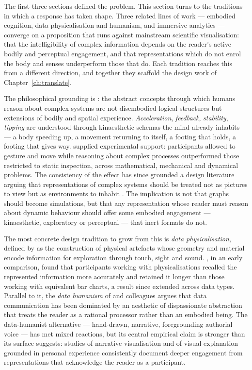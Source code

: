 The first three sections defined the problem. This section turns to the traditions in which a response has taken shape. Three related lines of work --- embodied cognition, data physicalisation and humanism, and immersive analytics --- converge on a proposition that runs against mainstream scientific visualisation: that the intelligibility of complex information depends on the reader's active bodily and perceptual engagement, and that representations which do not enrol the body and senses underperform those that do. Each tradition reaches this from a different direction, and together they scaffold the design work of Chapter~\ref{ch:translate}.

The philosophical grounding is \citet{lakoff1999}: the abstract concepts through which humans reason about complex systems are not disembodied logical structures but extensions of bodily and spatial experience. \emph{Acceleration}, \emph{feedback}, \emph{stability}, \emph{tipping} are understood through kinaesthetic schemas the mind already inhabits --- a body speeding up, a movement returning to itself, a footing that holds, a footing that gives way. \citet{kirsh2013} supplied experimental support: participants allowed to gesture and move while reasoning about complex processes outperformed those restricted to static inspection, across mathematical, mechanical and dynamical problems. The consistency of the effect has since grounded a design literature arguing that representations of complex systems should be treated not as pictures to view but as environments to inhabit \citep{tversky2019, hurtienne2011}. The implication is not that graphs should become simulations, but that any representation whose reader must reason about dynamic behaviour should offer some embodied engagement --- kinaesthetic, exploratory or perceptual --- that inert formats do not.

The most concrete design tradition to grow from this is \emph{data physicalisation}, defined by \citet{jansen2015} as the construction of physical artefacts whose geometry and material encode information for exploration through touch, sight and sound. \citet{moere2010}, in an early comparison, found that participants working with physicalisations recalled the represented information more accurately and retained it longer than those working with equivalent bar charts, a result since extended across data types. Parallel to it, the \emph{data humanism} of \citet{lupi2017} and colleagues argues that data communication has been dominated by an aesthetic of dispassionate abstraction that treats the reader as a rational processor rather than an embodied being. The data-humanist alternative --- hand-drawn, narrative, foregrounding authorial voice --- has met mixed reactions, but its central empirical claim is stronger than its surface suggests: studies of narrative visualisation \citep{segel2010} and of visual explanation grounded in personal experience \citep{morris2019} consistently document deeper engagement from representations that acknowledge the reader as a participant.

